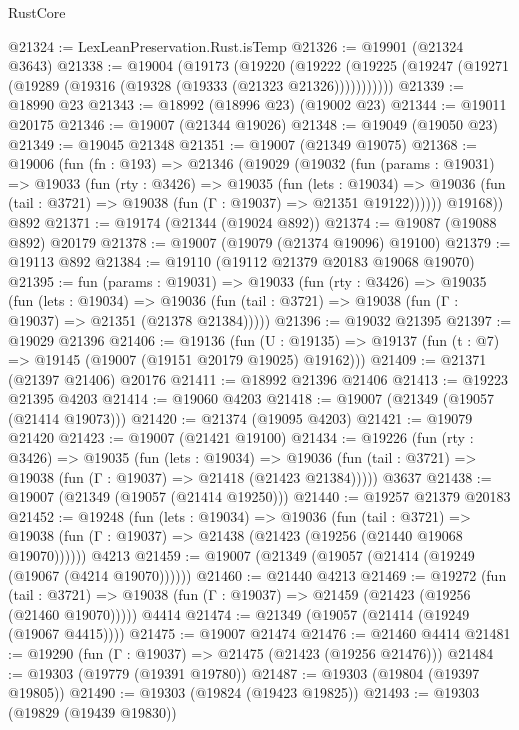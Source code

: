 \begin{lexlean}{RustCore}
\begin{coremodule}
@21324 := LexLeanPreservation.Rust.isTemp
@21326 := @19901 (@21324 @3643)
@21338 := @19004
    (@19173
      (@19220
        (@19222 (@19225 (@19247 (@19271 (@19289 (@19316 (@19328 (@19333 (@21323 @21326)))))))))))
@21339 := @18990 @23
@21343 := @18992 (@18996 @23) (@19002 @23)
@21344 := @19011 @20175
@21346 := @19007 (@21344 @19026)
@21348 := @19049 (@19050 @23)
@21349 := @19045 @21348
@21351 := @19007 (@21349 @19075)
@21368 := @19006
    (fun (fn : @193) =>
    @21346
      (@19029
        (@19032
          (fun (params : @19031) =>
          @19033
            (fun (rty : @3426) =>
            @19035
              (fun (lets : @19034) =>
              @19036 (fun (tail : @3721) => @19038 (fun (Γ : @19037) => @21351 @19122))))))
        @19168))
    @892
@21371 := @19174 (@21344 (@19024 @892))
@21374 := @19087 (@19088 @892) @20179
@21378 := @19007 (@19079 (@21374 @19096) @19100)
@21379 := @19113 @892
@21384 := @19110 (@19112 @21379 @20183 @19068 @19070)
@21395 := fun (params : @19031) =>
  @19033
    (fun (rty : @3426) =>
    @19035
      (fun (lets : @19034) =>
      @19036 (fun (tail : @3721) => @19038 (fun (Γ : @19037) => @21351 (@21378 @21384)))))
@21396 := @19032 @21395
@21397 := @19029 @21396
@21406 := @19136
    (fun (U : @19135) => @19137 (fun (t : @7) => @19145 (@19007 (@19151 @20179 @19025) @19162)))
@21409 := @21371 (@21397 @21406) @20176
@21411 := @18992 @21396 @21406
@21413 := @19223 @21395 @4203
@21414 := @19060 @4203
@21418 := @19007 (@21349 (@19057 (@21414 @19073)))
@21420 := @21374 (@19095 @4203)
@21421 := @19079 @21420
@21423 := @19007 (@21421 @19100)
@21434 := @19226
    (fun (rty : @3426) =>
    @19035
      (fun (lets : @19034) =>
      @19036 (fun (tail : @3721) => @19038 (fun (Γ : @19037) => @21418 (@21423 @21384)))))
    @3637
@21438 := @19007 (@21349 (@19057 (@21414 @19250)))
@21440 := @19257 @21379 @20183
@21452 := @19248
    (fun (lets : @19034) =>
    @19036
      (fun (tail : @3721) =>
      @19038 (fun (Γ : @19037) => @21438 (@21423 (@19256 (@21440 @19068 @19070))))))
    @4213
@21459 := @19007 (@21349 (@19057 (@21414 (@19249 (@19067 (@4214 @19070))))))
@21460 := @21440 @4213
@21469 := @19272
    (fun (tail : @3721) => @19038 (fun (Γ : @19037) => @21459 (@21423 (@19256 (@21460 @19070)))))
    @4414
@21474 := @21349 (@19057 (@21414 (@19249 (@19067 @4415))))
@21475 := @19007 @21474
@21476 := @21460 @4414
@21481 := @19290 (fun (Γ : @19037) => @21475 (@21423 (@19256 @21476)))
@21484 := @19303 (@19779 (@19391 @19780))
@21487 := @19303 (@19804 (@19397 @19805))
@21490 := @19303 (@19824 (@19423 @19825))
@21493 := @19303 (@19829 (@19439 @19830))

\end{coremodule}
\end{lexlean}
